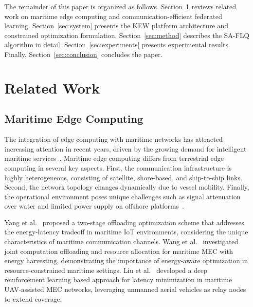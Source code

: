 \documentclass[journal]{IEEEtran}
\begin{document}
The remainder of this paper is organized as follows. Section~\ref{sec:related} reviews related work on maritime edge computing and communication-efficient federated learning. Section~\ref{sec:system} presents the KEW platform architecture and constrained optimization formulation. Section~\ref{sec:method} describes the SA-FLQ algorithm in detail. Section~\ref{sec:experiments} presents experimental results. Finally, Section~\ref{sec:conclusion} concludes the paper.

\section{Related Work}
\label{sec:related}

\subsection{Maritime Edge Computing}
The integration of edge computing with maritime networks has attracted increasing attention in recent years, driven by the growing demand for intelligent maritime services~\cite{Marine_communication_survey}. Maritime edge computing differs from terrestrial edge computing in several key aspects. First, the communication infrastructure is highly heterogeneous, consisting of satellite, shore-based, and ship-to-ship links. Second, the network topology changes dynamically due to vessel mobility. Finally, the operational environment poses unique challenges such as signal attenuation over water and limited power supply on offshore platforms~\cite{tInternetUnderwaterThings2021}.

Yang et al.~\cite{yangTwoStageOffloadingOptimization2020} proposed a two-stage offloading optimization scheme that addresses the energy-latency tradeoff in maritime IoT environments, considering the unique characteristics of maritime communication channels. Wang et al.~\cite{wangJointComputationOffloading2024} investigated joint computation offloading and resource allocation for maritime MEC with energy harvesting, demonstrating the importance of energy-aware optimization in resource-constrained maritime settings. Liu et al.~\cite{liu2022drlMaritimeUAVMEC} developed a deep reinforcement learning based approach for latency minimization in maritime UAV-assisted MEC networks, leveraging unmanned aerial vehicles as relay nodes to extend coverage.
\end{document}
